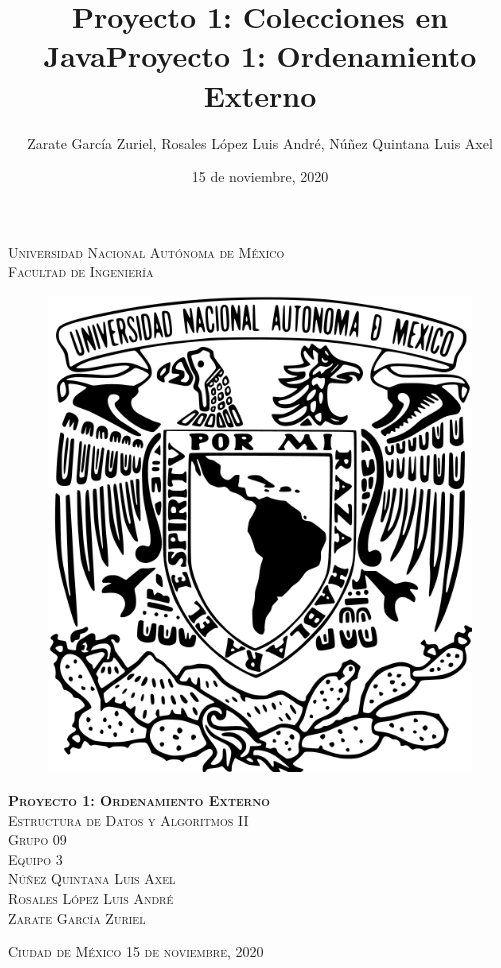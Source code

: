 \documentclass[12pt, letterpaper]{report}
\title{Proyecto 1: Colecciones en Java}
\author{Zarate García Zuriel, Rosales López Luis André, Núñez Quintana Luis Axel}
\date{15 de noviembre, 2020}
\begin{document}
\title{Proyecto 1: Ordenamiento Externo}
	\begin{titlepage}
		\begin{center}
			\textsc{\Large Universidad Nacional Autónoma de México}\\
			\textsc{\large Facultad de Ingeniería}\\[2em]
			\begin{figure}[h]
				\begin{center}
					\includegraphics[scale=0.50]{unamLogo.jpg}
				\end{center}
			\end{figure}
			\vspace{1em}
			\textsc{\huge \textbf{Proyecto 1: Ordenamiento Externo}}\\[2em]
			\textsc{\Large Estructura de Datos y Algoritmos II}\\[1em]
			\textsc{\large Grupo 09}\\[1em]
			\textsc{\Large Equipo 3}\\[1em]
			\textsc{Núñez Quintana Luis Axel}\\[1em]
			\textsc{Rosales López Luis André}\\[1em]
			\textsc{Zarate García Zuriel}
		\end{center}
		\vspace*{\fill}
		\textsc{Ciudad de México \hspace*{\fill}15 de noviembre, 2020}
	\end{titlepage}
    
\end{document}
